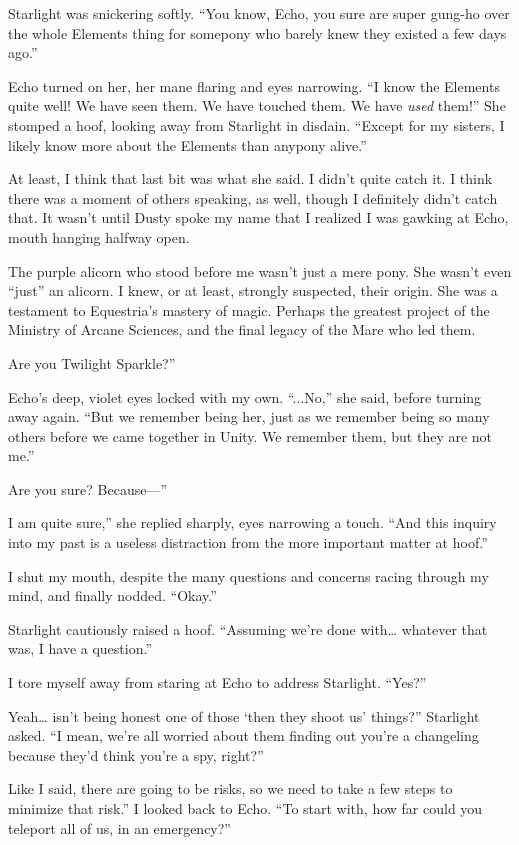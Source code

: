 Starlight was snickering softly. “You know, Echo, you sure are super gung-ho over the whole Elements thing for somepony who barely knew they existed a few days ago.”

Echo turned on her, her mane flaring and eyes narrowing. “I know the Elements quite well! We have seen them. We have touched them. We have \textit{used} them!” She stomped a hoof, looking away from Starlight in disdain. “Except for my sisters, I likely know more about the Elements than anypony alive.”

At least, I think that last bit was what she said. I didn’t quite catch it. I think there was a moment of others speaking, as well, though I definitely didn’t catch that. It wasn’t until Dusty spoke my name that I realized I was gawking at Echo, mouth hanging halfway open.

The purple alicorn who stood before me wasn’t just a mere pony. She wasn’t even “just” an alicorn. I knew, or at least, strongly suspected, their origin. She was a testament to Equestria’s mastery of magic. Perhaps the greatest project of the Ministry of Arcane Sciences, and the final legacy of the Mare who led them.

\leavevmode{}Are you Twilight Sparkle?”

Echo’s deep, violet eyes locked with my own. “...No,” she said, before turning away again. “But we remember being her, just as we remember being so many others before we came together in Unity. We remember them, but they are not me.”

\leavevmode{}Are you sure? Because—”

\leavevmode{}I am quite sure,” she replied sharply, eyes narrowing a touch. “And this inquiry into my past is a useless distraction from the more important matter at hoof.”

I shut my mouth, despite the many questions and concerns racing through my mind, and finally nodded. “Okay.”

Starlight cautiously raised a hoof. “Assuming we’re done with… whatever that was, I have a question.”

I tore myself away from staring at Echo to address Starlight. “Yes?”

\leavevmode{}Yeah… isn’t being honest one of those ‘then they shoot us’ things?” Starlight asked. “I mean, we’re all worried about them finding out you’re a changeling because they’d think you’re a spy, right?”

\leavevmode{}Like I said, there are going to be risks, so we need to take a few steps to minimize that risk.” I looked back to Echo. “To start with, how far could you teleport all of us, in an emergency?”

